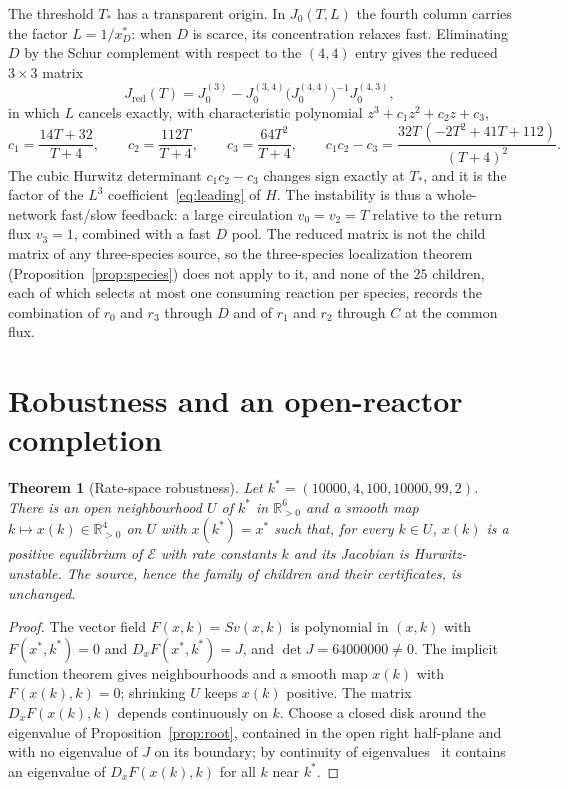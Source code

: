 \documentclass[11pt,a4paper]{article}
\theoremstyle{plain}
\newtheorem{theorem}{Theorem}[section]
\theoremstyle{definition}
\theoremstyle{remark}
\newcommand{\R}{\mathbb{R}}
\newcommand{\xs}{x^{*}}
\begin{document}
The threshold $T_*$ has a transparent origin. In $J_0(T,L)$ the fourth column carries the factor $L=1/x_D^*$: when $D$ is scarce, its concentration relaxes fast. Eliminating $D$ by the Schur complement with respect to the $(4,4)$ entry gives the reduced $3\times3$ matrix
\[
J_{\mathrm{red}}(T)=J_0^{(3)}-J_0^{(3,4)}\bigl(J_0^{(4,4)}\bigr)^{-1}J_0^{(4,3)} ,
\]
in which $L$ cancels exactly, with characteristic polynomial $z^3+c_1z^2+c_2z+c_3$,
\[
c_1=\frac{14T+32}{T+4},\qquad c_2=\frac{112T}{T+4},\qquad c_3=\frac{64T^2}{T+4},\qquad
c_1c_2-c_3=\frac{32T\,(-2T^2+41T+112)}{(T+4)^2}.
\]
The cubic Hurwitz determinant $c_1c_2-c_3$ changes sign exactly at $T_*$, and it is the factor of the $L^3$ coefficient~\eqref{eq:leading} of $H$. The instability is thus a whole-network fast/slow feedback: a large circulation $v_0=v_2=T$ relative to the return flux $v_3=1$, combined with a fast $D$ pool. The reduced matrix is not the child matrix of any three-species source, so the three-species localization theorem (Proposition~\ref{prop:species}) does not apply to it, and none of the $25$ children, each of which selects at most one consuming reaction per species, records the combination of $r_0$ and $r_3$ through $D$ and of $r_1$ and $r_2$ through $C$ at the common flux.

\section{Robustness and an open-reactor completion}\label{sec:robust}

\begin{theorem}[Rate-space robustness]\label{thm:robust}
Let $k^*=(10000,4,100,10000,99,2)$. There is an open neighbourhood $U$ of $k^*$ in $\R^6_{>0}$ and a smooth map $k\mapsto x(k)\in\R^4_{>0}$ on $U$ with $x(k^*)=\xs$ such that, for every $k\in U$, $x(k)$ is a positive equilibrium of $\mathcal E$ with rate constants $k$ and its Jacobian is Hurwitz-unstable. The source, hence the family of children and their certificates, is unchanged.
\end{theorem}

\begin{proof}
The vector field $F(x,k)=Sv(x,k)$ is polynomial in $(x,k)$ with $F(\xs,k^*)=0$ and $D_xF(\xs,k^*)=J$, and $\det J=64000000\ne0$. The implicit function theorem gives neighbourhoods and a smooth map $x(k)$ with $F(x(k),k)=0$; shrinking $U$ keeps $x(k)$ positive. The matrix $D_xF(x(k),k)$ depends continuously on $k$. Choose a closed disk around the eigenvalue of Proposition~\ref{prop:root}, contained in the open right half-plane and with no eigenvalue of $J$ on its boundary; by continuity of eigenvalues~\cite[App.~D]{HornJohnson2013} it contains an eigenvalue of $D_xF(x(k),k)$ for all $k$ near $k^*$.
\end{proof}
\end{document}
